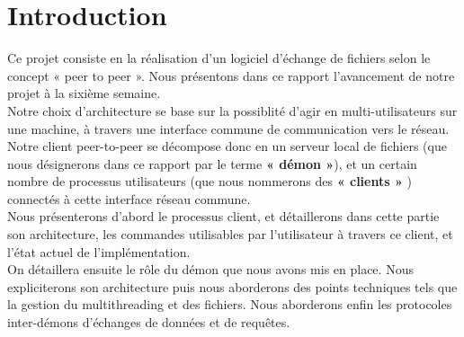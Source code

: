 \chapter*{Introduction}
	Ce projet consiste en la réalisation d'un logiciel d'échange de fichiers 
	selon le concept « peer to peer ». Nous présentons dans ce rapport 
	l'avancement de notre projet à la sixième semaine.\\
	
	Notre choix d'architecture se base sur la possiblité d'agir en multi-utilisateurs 
	sur une machine, à travers une interface commune de communication vers le réseau.
	Notre client peer-to-peer se décompose donc en un serveur local de fichiers 
	(que nous désignerons dans ce rapport par le terme \textbf{« démon »}), et un certain 
	nombre de processus utilisateurs (que nous nommerons des \textbf{« clients »} )
	connectés à cette interface réseau commune.\\
	
	Nous présenterons d'abord le processus client, et détaillerons dans cette partie son 
	architecture, les commandes utilisables par l'utilisateur à travers ce client, et
	l'état actuel de l'implémentation.\\
	
	On détaillera ensuite le rôle du démon que nous avons mis en place.
	Nous expliciterons son architecture puis nous aborderons des points 
	techniques tels que la gestion du multithreading et des fichiers. Nous 
	aborderons enfin les protocoles inter-démons d'échanges de données et 
	de requêtes. 
